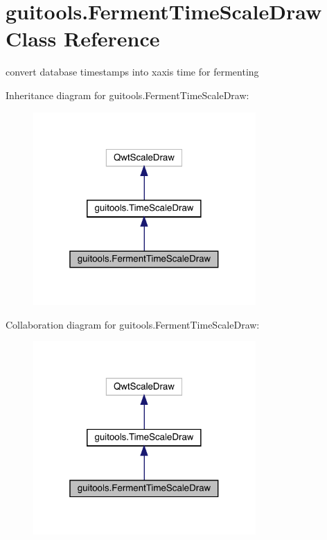 \hypertarget{classguitools_1_1_ferment_time_scale_draw}{}\section{guitools.\+Ferment\+Time\+Scale\+Draw Class Reference}
\label{classguitools_1_1_ferment_time_scale_draw}


convert database timestamps into xaxis time for fermenting  




Inheritance diagram for guitools.\+Ferment\+Time\+Scale\+Draw\+:\nopagebreak
\begin{figure}[H]
\begin{center}
\leavevmode
\includegraphics[width=241pt]{classguitools_1_1_ferment_time_scale_draw__inherit__graph}
\end{center}
\end{figure}


Collaboration diagram for guitools.\+Ferment\+Time\+Scale\+Draw\+:\nopagebreak
\begin{figure}[H]
\begin{center}
\leavevmode
\includegraphics[width=241pt]{classguitools_1_1_ferment_time_scale_draw__coll__graph}
\end{center}
\end{figure}
